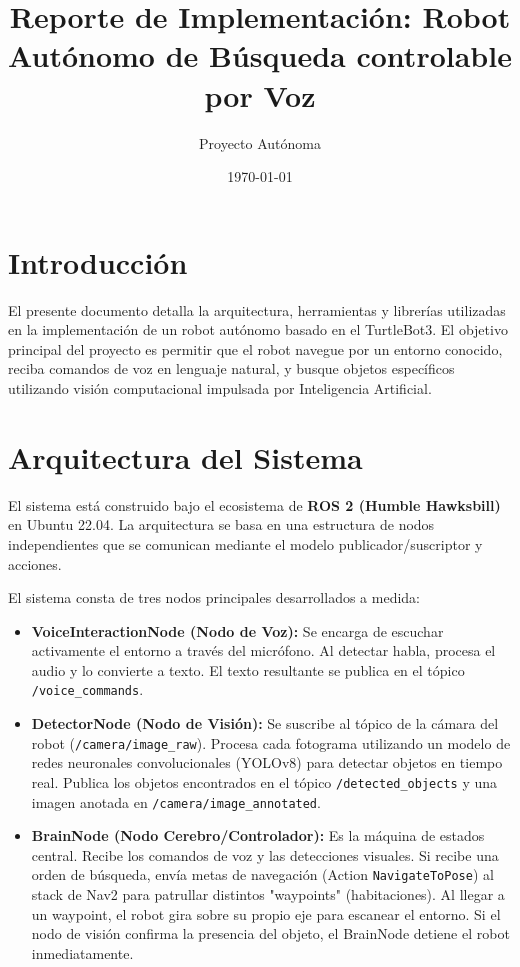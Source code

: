 \documentclass[12pt,a4paper]{article}
\title{\textbf{Reporte de Implementación: Robot Autónomo de Búsqueda controlable por Voz}}
\author{Proyecto Autónoma}
\date{\today}
\begin{document}
\maketitle

\section{Introducción}
El presente documento detalla la arquitectura, herramientas y librerías utilizadas en la implementación de un robot autónomo basado en el TurtleBot3. El objetivo principal del proyecto es permitir que el robot navegue por un entorno conocido, reciba comandos de voz en lenguaje natural, y busque objetos específicos utilizando visión computacional impulsada por Inteligencia Artificial.

\section{Arquitectura del Sistema}
El sistema está construido bajo el ecosistema de \textbf{ROS 2 (Humble Hawksbill)} en Ubuntu 22.04. La arquitectura se basa en una estructura de nodos independientes que se comunican mediante el modelo publicador/suscriptor y acciones. 

El sistema consta de tres nodos principales desarrollados a medida:
\begin{itemize}
    \item \textbf{VoiceInteractionNode (Nodo de Voz):} Se encarga de escuchar activamente el entorno a través del micrófono. Al detectar habla, procesa el audio y lo convierte a texto. El texto resultante se publica en el tópico \texttt{/voice\_commands}.
    \item \textbf{DetectorNode (Nodo de Visión):} Se suscribe al tópico de la cámara del robot (\texttt{/camera/image\_raw}). Procesa cada fotograma utilizando un modelo de redes neuronales convolucionales (YOLOv8) para detectar objetos en tiempo real. Publica los objetos encontrados en el tópico \texttt{/detected\_objects} y una imagen anotada en \texttt{/camera/image\_annotated}.
    \item \textbf{BrainNode (Nodo Cerebro/Controlador):} Es la máquina de estados central. Recibe los comandos de voz y las detecciones visuales. Si recibe una orden de búsqueda, envía metas de navegación (Action \texttt{NavigateToPose}) al stack de Nav2 para patrullar distintos "waypoints" (habitaciones). Al llegar a un waypoint, el robot gira sobre su propio eje para escanear el entorno. Si el nodo de visión confirma la presencia del objeto, el BrainNode detiene el robot inmediatamente.
\end{itemize}
\end{document}
